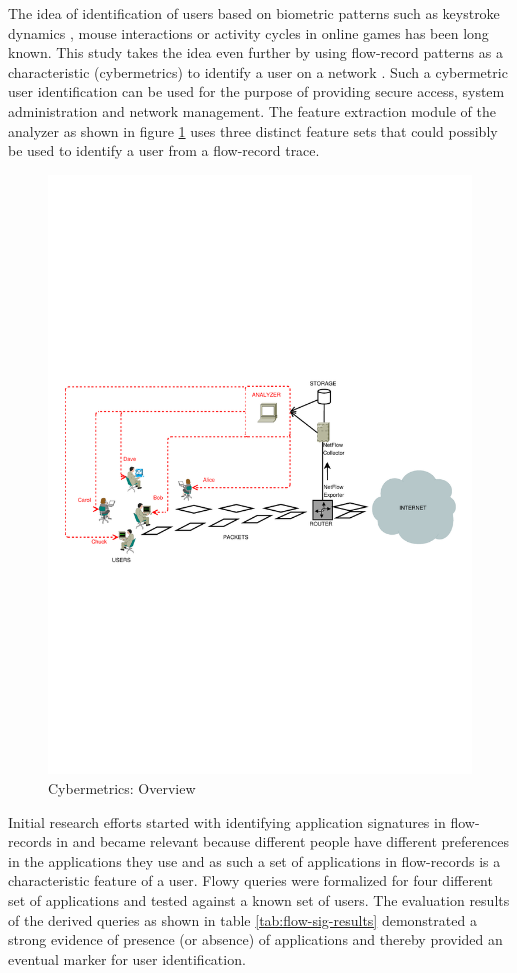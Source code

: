 The idea of identification of users based on biometric patterns such as keystroke dynamics \cite{fbergadano:2002}, mouse interactions \cite{aahmed:2007} or activity cycles in online games \cite{kchen:2007} has been long known. This study takes the idea even further by using flow-record patterns as a characteristic (cybermetrics) to identify a user on a network \cite{nmelnikov:thesis:2010, nmelnikov:2010}. Such a cybermetric user identification can be used for the purpose of providing secure access, system administration and network management. The feature extraction module of the analyzer as shown in figure \ref{fig:cybermetrics-overview} uses three distinct feature sets that could possibly be used to identify a user from a flow-record trace.
\begin{figure}[h!]
\begin{center}
  \includegraphics* [width=0.7\linewidth]{figures/cybermetrics-overview}
  \caption{Cybermetrics: Overview \cite{nmelnikov:thesis:2010}}
  \label{fig:cybermetrics-overview}
\end{center}
\end{figure}

Initial research efforts started with identifying application signatures in flow-records in \cite{vperelman:2011, vperelman:thesis:2010} and became relevant because different people have different preferences in the applications they use  and as such a set of applications in flow-records is a characteristic feature of a user. Flowy queries were formalized for four different set of applications and tested against a known set of users. The evaluation results of the derived queries as shown in table \ref{tab:flow-sig-results} demonstrated a strong evidence of presence (or absence) of applications and thereby provided an eventual marker for user identification.

